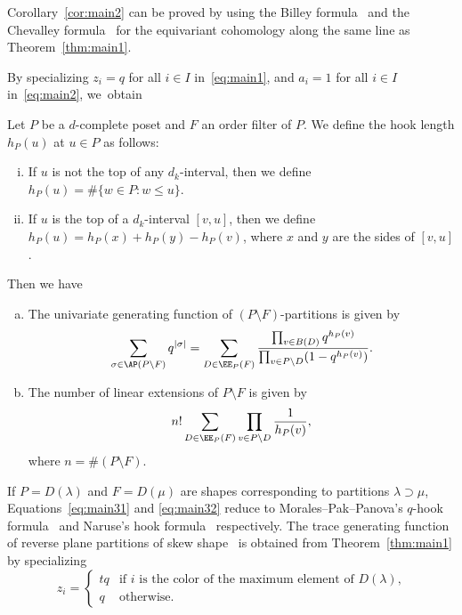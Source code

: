 \begin{rema}
Corollary~\ref{cor:main2} can be proved by using the Billey formula~\cite[Theorem~4]{B} 
and the Chevalley formula~\cite[Theorem~11.1.7 and Corollary~11.3.17]{Ku} 
for the equivariant cohomology along the same line as Theorem~\ref{thm:main1}.
\end{rema}

By specializing $z_i = q$ for all $i \in I$ in~\eqref{eq:main1}, 
and $a_i = 1$ for all $i \in I$ in~\eqref{eq:main2}, we~obtain

\begin{coro}
\label{cor:main3}
Let $P$ be a $d$-complete poset and $F$ an order filter of $P$.
We define the hook length $h_P(u)$ at $u \in P$ as follows:
\begin{enumerate}[(i)]
\item\label{coro5.6_i} %
If $u$ is not the top of any $d_k$-interval, then we define $h_P(u) = \# \{ w \in P : w \le u \}$.
\item\label{coro5.6_ii} %
If $u$ is the top of a $d_k$-interval $[v,u]$, then we define 
$h_P(u) = h_P(x) + h_P(y) - h_P(v)$, 
where $x$ and $y$ are the sides of $[v,u]$.
\end{enumerate}
Then we have
\begin{enumerate}[(a)]
\item\label{coro5.6_a} %
The univariate generating function of $(P \setminus F)$-partitions is given by
\begin{equation}
\label{eq:main31}
\sum_{\sigma \in \AP(P \setminus F)}
 q^{|\sigma|}
 =
\sum_{D \in \EE_P(F)}
\frac{ \prod_{v \in B(D)} q^{h_P(v)} }
         { \prod_{v \in P \setminus D} (1-q^{h_P(v)}) }.
\end{equation}
\item\label{coro5.6_b} %
The number of linear extensions of $P \setminus F$ is given by
\begin{equation}
\label{eq:main32}
n! \sum_{D \in \EE_P(F)} \prod_{v \in P \setminus D} \frac{1}{h_P(v)},
\end{equation}
where $n = \# (P \setminus F)$.
\end{enumerate}
\end{coro}

If $P = D(\lambda)$ and $F = D(\mu)$ are shapes corresponding to partitions $\lambda \supset \mu$,
Equations~\eqref{eq:main31} and \eqref{eq:main32} reduce to 
Morales--Pak--Panova's $q$-hook formula~\cite[Corollary~6.17]{MPP} and Naruse's hook formula~\cite{Naruse} 
respectively.
The trace generating function of reverse plane partitions of skew shape~\cite[Corollary~6.20]{MPP}
is obtained from Theorem~\ref{thm:main1} by specializing
$$
z_i = \begin{cases}
 tq &\text{if $i$ is the color of the maximum element of $D(\lambda)$,} \\
 q &\text{otherwise.}
\end{cases}
$$

